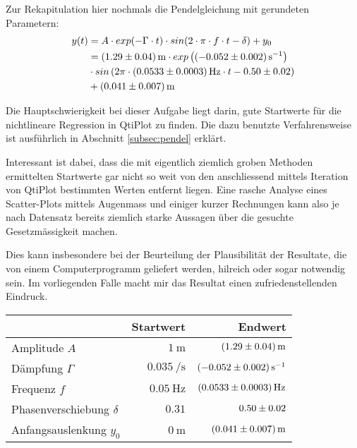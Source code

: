 Zur Rekapitulation hier nochmals die Pendelgleichung mit gerundeten Parametern:
\begin{align*}
    y(t)   & = A \cdot exp(-\Gamma \cdot t) \cdot sin(2 \cdot \pi \cdot f \cdot t - \delta) + y_0 \\
           & =     \SI[separate-uncertainty = true]{1.29 \pm 0.04}{\meter}
           \cdot exp\left(\SI[separate-uncertainty = true]{-0.052 \pm 0.002}{\per\second}\right) \\
           & \cdot sin\left(2\pi \cdot \SI[separate-uncertainty = true]{0.0533 \pm 0.0003}{\hertz} \cdot t - \num[separate-uncertainty = true]{0.50 \pm 0.02}\right) \\
           & + \SI[separate-uncertainty = true]{0.041 \pm 0.007}{\meter}
\end{align*}

Die  Hauptschwierigkeit  bei  dieser  Aufgabe  liegt  darin,  gute  Startwerte
f\"ur  die nichtlineare  Regression in  QtiPlot zu  finden. Die dazu  benutzte
Verfahrensweise ist ausf\"uhrlich in Abschnitt \ref{subsec:pendel} erkl\"art.

Interessant  ist  dabei, dass  die  mit  eigentlich ziemlich  groben  Methoden
ermittelten  Startwerte  gar  nicht  so weit  von  den  anschliessend  mittels
Iteration von  QtiPlot bestimmten Werten entfernt  liegen. Eine rasche Analyse
eines Scatter-Plots mittels Augenmass und  einiger kurzer Rechnungen kann also
je  nach  Datensatz  bereits  ziemlich starke  Aussagen  \"uber  die  gesuchte
Gesetzm\"assigkeit machen.

Dies kann insbesondere bei der  Beurteilung der Plausibilit\"at der Resultate,
die von einem Computerprogramm geliefert werden, hilreich oder sogar notwendig
sein. Im vorliegenden  Falle macht mir das  Resultat einen zufriedenstellenden
Eindruck.

\begin{center}
\begin{tabular}{lrr}
    \toprule
                                & Startwert                  & Endwert \\
    \midrule
    Amplitude $A$               &  $\SI{1}{\meter}$          & $\SI{ 1.29 \pm 0.04}{\meter}$ \\
    D\"ampfung $\Gamma$         &  $\SI{0.035}{\per\second}$ & $\SI{-0.052 \pm 0.002}{\per\second}$ \\
    Frequenz $f$                &  $\SI{0.05}{\hertz}$       & $\SI{ 0.0533  \pm 0.0003}{\hertz}$ \\
    Phasenverschiebung $\delta$ &  $0.31$                    & $\num{0.50  \pm 0.02}$ \\
    Anfangsauslenkung $y_0$     &  $\SI{0}{\meter}$          & $\SI{ 0.041 \pm 0.007}{\meter}$ \\
    \bottomrule
\end{tabular}
\end{center}


